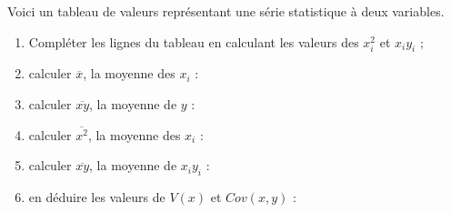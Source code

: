 \documentclass[11pt]{article}
\begin{document}
\begin{exercice}
Voici un tableau de valeurs représentant une série statistique à deux variables.

\begin{center}

\end{center}

\begin{enumerate}
\item Compléter les lignes du tableau en calculant les valeurs
des $x_i^2$ et $x_iy_i$ ;
\item calculer $\overline{x}$, la moyenne des $x_i$ : \dotfill \\ \dtf
\item calculer $\overline{xy}$, la moyenne de $y$ : \dotfill  \\ \dtf
\item calculer $\overline{x^2}$, la moyenne des $x_i$ : \dotfill \\ \dtf
\item calculer $\overline{xy}$, la moyenne de $x_iy_i$ : \dotfill  \\ \dtf
\item en déduire les valeurs de $V(x)$ et $Cov(x,y)$ :
\dotfill \\ \dtf
\end{enumerate}
\end{exercice}
\end{document}
